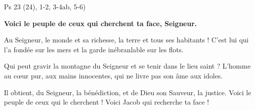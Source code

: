 Ps 23 (24), 1-2, 3-4ab, 5-6)

\textbf{
Voici le peuple de ceux qui cherchent ta face, Seigneur.
}

\smallskip

Au Seigneur, le monde et sa richesse,
la terre et tous ses habitants !
C’est lui qui l’a fondée sur les mers
et la garde inébranlable sur les flots.

\smallskip

Qui peut gravir la montagne du Seigneur
et se tenir dans le lieu saint ?
L’homme au cœur pur, aux mains innocentes,
qui ne livre pas son âme aux idoles.

\smallskip

Il obtient, du Seigneur, la bénédiction,
et de Dieu son Sauveur, la justice.
Voici le peuple de ceux qui le cherchent !
Voici Jacob qui recherche ta face !
